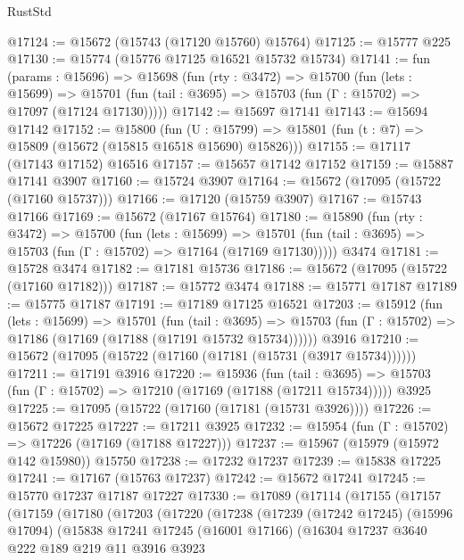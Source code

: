 \begin{lexlean}{RustStd}
\begin{coremodule}
@17124 := @15672 (@15743 (@17120 @15760) @15764)
@17125 := @15777 @225
@17130 := @15774 (@15776 @17125 @16521 @15732 @15734)
@17141 := fun (params : @15696) =>
  @15698
    (fun (rty : @3472) =>
    @15700
      (fun (lets : @15699) =>
      @15701 (fun (tail : @3695) => @15703 (fun (Γ : @15702) => @17097 (@17124 @17130)))))
@17142 := @15697 @17141
@17143 := @15694 @17142
@17152 := @15800
    (fun (U : @15799) => @15801 (fun (t : @7) => @15809 (@15672 (@15815 @16518 @15690) @15826)))
@17155 := @17117 (@17143 @17152) @16516
@17157 := @15657 @17142 @17152
@17159 := @15887 @17141 @3907
@17160 := @15724 @3907
@17164 := @15672 (@17095 (@15722 (@17160 @15737)))
@17166 := @17120 (@15759 @3907)
@17167 := @15743 @17166
@17169 := @15672 (@17167 @15764)
@17180 := @15890
    (fun (rty : @3472) =>
    @15700
      (fun (lets : @15699) =>
      @15701 (fun (tail : @3695) => @15703 (fun (Γ : @15702) => @17164 (@17169 @17130)))))
    @3474
@17181 := @15728 @3474
@17182 := @17181 @15736
@17186 := @15672 (@17095 (@15722 (@17160 @17182)))
@17187 := @15772 @3474
@17188 := @15771 @17187
@17189 := @15775 @17187
@17191 := @17189 @17125 @16521
@17203 := @15912
    (fun (lets : @15699) =>
    @15701
      (fun (tail : @3695) =>
      @15703 (fun (Γ : @15702) => @17186 (@17169 (@17188 (@17191 @15732 @15734))))))
    @3916
@17210 := @15672 (@17095 (@15722 (@17160 (@17181 (@15731 (@3917 @15734))))))
@17211 := @17191 @3916
@17220 := @15936
    (fun (tail : @3695) => @15703 (fun (Γ : @15702) => @17210 (@17169 (@17188 (@17211 @15734)))))
    @3925
@17225 := @17095 (@15722 (@17160 (@17181 (@15731 @3926))))
@17226 := @15672 @17225
@17227 := @17211 @3925
@17232 := @15954 (fun (Γ : @15702) => @17226 (@17169 (@17188 @17227)))
@17237 := @15967 (@15979 (@15972 @142 @15980)) @15750
@17238 := @17232 @17237
@17239 := @15838 @17225
@17241 := @17167 (@15763 @17237)
@17242 := @15672 @17241
@17245 := @15770 @17237 @17187 @17227
@17330 := @17089
    (@17114
      (@17155
        (@17157
          (@17159
            (@17180
              (@17203
                (@17220
                  (@17238
                    (@17239
                      (@17242 @17245)
                      (@15996 @17094)
                      (@15838
                        @17241
                        @17245
                        (@16001 @17166)
                        (@16304
                          @17237
                          @3640
                          @222
                          @189
                          @219
                          @11
                          @3916
                          @3923

\end{coremodule}
\end{lexlean}
